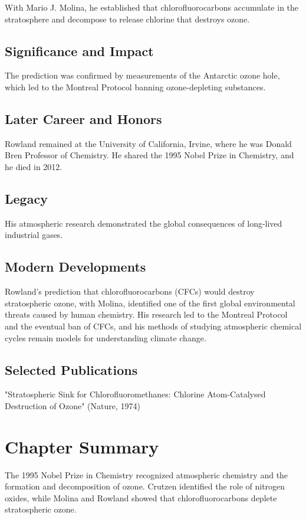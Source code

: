 With Mario J. Molina, he established that chlorofluorocarbons accumulate in the stratosphere and decompose to release chlorine that destroys ozone.

\subsection*{Significance and Impact}

The prediction was confirmed by measurements of the Antarctic ozone hole, which led to the Montreal Protocol banning ozone-depleting substances.

\subsection*{Later Career and Honors}

Rowland remained at the University of California, Irvine, where he was Donald Bren Professor of Chemistry. He shared the 1995 Nobel Prize in Chemistry, and he died in 2012.

\subsection*{Legacy}

His atmospheric research demonstrated the global consequences of long-lived industrial gases.

\subsection*{Modern Developments}

Rowland's prediction that chlorofluorocarbons (CFCs) would destroy stratospheric ozone, with Molina, identified one of the first global environmental threats caused by human chemistry. His research led to the Montreal Protocol and the eventual ban of CFCs, and his methods of studying atmospheric chemical cycles remain models for understanding climate change.

\subsection*{Selected Publications}

"Stratospheric Sink for Chlorofluoromethanes: Chlorine Atom-Catalysed Destruction of Ozone" (Nature, 1974)

\clearpage

\section*{Chapter Summary}

The 1995 Nobel Prize in Chemistry recognized atmospheric chemistry and the formation and decomposition of ozone. Crutzen identified the role of nitrogen oxides, while Molina and Rowland showed that chlorofluorocarbons deplete stratospheric ozone.
